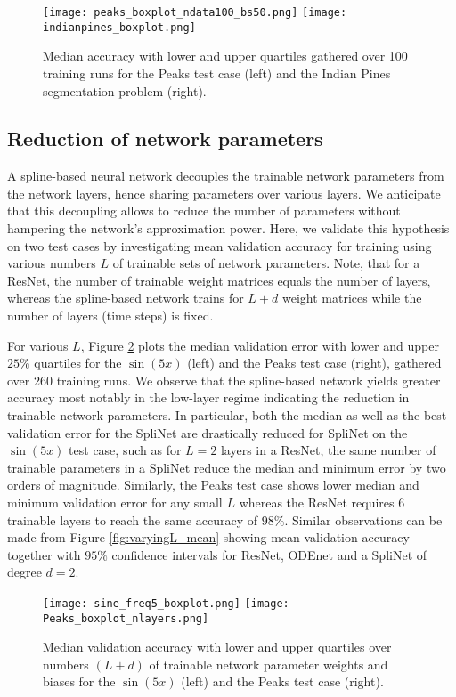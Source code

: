 \documentclass[12pt]{amsart}
\begin{document}
\begin{figure}[!htb]
    \centering
    \texttt{[image: peaks\_boxplot\_ndata100\_bs50.png]}
    \texttt{[image: indianpines\_boxplot.png]}
    \caption{Median accuracy with lower and upper quartiles gathered over 100 training runs for the Peaks test case (left) and the Indian Pines segmentation problem (right).}
    \label{fig:boxplot_peaks_indianpines}
\end{figure}


\subsection{Reduction of network parameters}
A spline-based neural network decouples the trainable network parameters from the network layers, hence sharing parameters over various layers.
We anticipate that this decoupling allows to reduce the number of parameters without hampering the network's approximation power. Here, we validate this hypothesis on two test cases by investigating mean validation accuracy for training using various numbers $L$ of trainable sets of network parameters.
Note, that for a ResNet, the number of trainable weight matrices equals the number of layers, whereas the spline-based network trains for $L+d$ weight matrices while the number of layers (time steps) is fixed.

For various $L$, Figure \ref{fig:varyingL_boxplots} plots the median validation error with lower and upper $25\%$ quartiles for the $\sin(5x)$ (left) and the Peaks test case (right), gathered over 260 training runs. We observe that the spline-based network yields greater accuracy most notably in the low-layer regime indicating the reduction in trainable network parameters. In particular, both the median as well as the best validation error for the SpliNet are drastically reduced for SpliNet on the $\sin(5x)$ test case, such as for $L=2$ layers in a ResNet, the same number of trainable parameters in a SpliNet reduce the median and minimum error by two orders of magnitude. Similarly, the Peaks test case shows lower median and minimum validation error for any small $L$ whereas the ResNet requires 6 trainable layers to reach the same accuracy of $98\%$.
Similar observations can be made from Figure \ref{fig:varyingL_mean} showing mean validation accuracy together with $95\%$ confidence intervals for ResNet, ODEnet and a SpliNet of degree $d=2$.

\begin{figure}
    \centering
    \texttt{[image: sine\_freq5\_boxplot.png]}
    \texttt{[image: Peaks\_boxplot\_nlayers.png]}
    \caption{Median validation accuracy with lower and upper quartiles over numbers $(L+d)$ of trainable network parameter weights and biases for the $\sin(5x)$ (left) and the Peaks test case (right).}
    \label{fig:varyingL_boxplots}
\end{figure}
\end{document}
